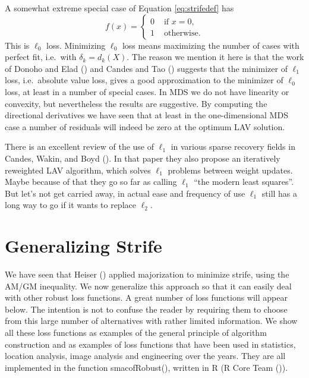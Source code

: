 \documentclass[
  12pt,
  letterpaper,
  DIV=11,
  numbers=noendperiod]{scrartcl}
\newcommand{\sectionbreak}{\pagebreak}
\theoremstyle{plain}
\theoremstyle{plain}
\theoremstyle{plain}
\theoremstyle{definition}
\theoremstyle{remark}
\begin{document}
A somewhat extreme special case of Equation \eqref{eq:strifedef} has \[
f(x)=\begin{cases}
0&\text{ if }x = 0,\\
1&\text{ otherwise}.
\end{cases}
\] This is \(\ell_0\) loss. Minimizing \(\ell_0\) loss means maximizing
the number of cases with perfect fit, i.e.~with \(\delta_k=d_k(X)\). The
reason we mention it here is that the work of Donoho and Elad
() and Candes and Tao
() suggests that the minimizer of
\(\ell_1\) loss, i.e.~absolute value loss, gives a good approximation to
the minimizer of \(\ell_0\) loss, at least in a number of special cases.
In MDS we do not have linearity or convexity, but nevertheless the
results are suggestive. By computing the directional derivatives we have
seen that at least in the one-dimensional MDS case a number of residuals
will indeed be zero at the optimum LAV solution.

There is an excellent review of the use of \(\ell_1\) in various sparse
recovery fields in Candes, Wakin, and Boyd
(). In that paper they also
propose an iteratively reweighted LAV algorithm, which solves \(\ell_1\)
problems between weight updates. Maybe because of that they go so far as
calling \(\ell_1\) ``the modern least squares''. But let's not get
carried away, in actual ease and frequency of use \(\ell_1\) still has a
long way to go if it wants to replace \(\ell_2\).

\sectionbreak

\section{Generalizing Strife}\label{generalizing-strife}

We have seen that Heiser () applied
majorization to minimize strife, using the AM/GM inequality. We now
generalize this approach so that it can easily deal with other robust
loss functions. A great number of loss functions will appear below. The
intention is not to confuse the reader by requiring them to choose from
this large number of alternatives with rather limited information. We
show all these loss functions as examples of the general principle of
algorithm construction and as examples of loss functions that have been
used in statistics, location analysis, image analysis and engineering
over the years. They are all implemented in the function smacofRobust(),
written in R (R Core Team ()).
\end{document}
